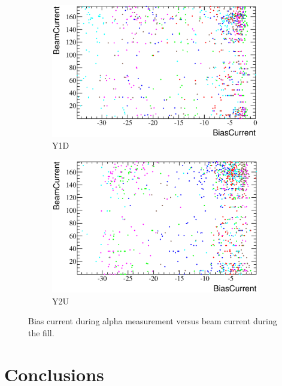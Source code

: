 \documentclass[a4paper,12pt]{article}
\begin{document}
\begin{figure}[p]
\begin{subfigure}[b]{0.5\textwidth}
\includegraphics[width=\textwidth]{gfx/run13_alpha_study/Y1D/c_hBiasCurrent_BeamCurrent.eps}
\caption{Y1D}
\end{subfigure}
\begin{subfigure}[b]{0.5\textwidth}
\includegraphics[width=\textwidth]{gfx/run13_alpha_study/Y2U/c_hBiasCurrent_BeamCurrent.eps}
\caption{Y2U}
\end{subfigure}
\caption{Bias current during alpha measurement versus beam current during the fill.}
\end{figure}

\section{Conclusions}
\end{document}

